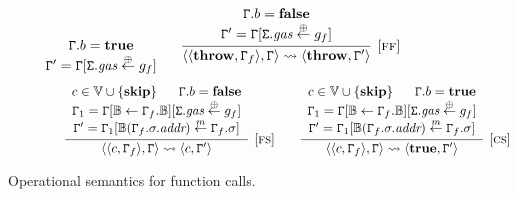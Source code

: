 \begin{figure}[t]
$${
	\begin{array}{c}	
	\cstate.b = \textbf{true}\\
	\cstate' = \cstate[\gstate.\textit{gas} \addg g_f]
	\end{array}
}
~~~~
\infer[{[\rname{ff}]}]{\conf{\conf{\textbf{throw},\cstate_f},\cstate} \leadsto \conf{\textbf{throw},\cstate'}}
{
	\begin{array}{c}	
	\cstate.b = \textbf{false}\\
	\cstate' = \cstate[\gstate.\textit{gas} \addg g_f]
	\end{array}
}
$$
\vspace{-0.5em}
$$
~~~~~~~~~~~~~
\infer[{[\rname{fs}]}]{\conf{\conf{c,\cstate_f},\cstate} \leadsto \conf{c,\cstate'}}
{
	\begin{array}{c}
	c \in \mathbb{V} \cup \{\textbf{skip}\}	~~~~~ \cstate.b = \textbf{false}
	\\
	\cstate_1 = \cstate[\chain \leftarrow \cstate_f.\chain][\gstate.\textit{gas} \addg g_f]
	\\
	\cstate' = \cstate_1[\chain(\cstate_f.\lstate.\textit{addr}) \stackrel{m}{\leftarrow} \cstate_f.\lstate]
	\end{array}
}
~~~~~~
\infer[{[\rname{cs}]}]{\conf{\conf{c,\cstate_f},\cstate} \leadsto \conf{\textbf{true},\cstate'}}
{
	\begin{array}{c}
	c \in \mathbb{V} \cup \{\textbf{skip}\}	~~~~~ \cstate.b = \textbf{true}\\
	\cstate_1 = \cstate[\chain \leftarrow \cstate_f.\chain][\gstate.\textit{gas} \addg g_f]
	\\
	\cstate' = \cstate_1[\chain(\cstate_f.\lstate.\textit{addr}) \stackrel{m}{\leftarrow} \cstate_f.\lstate]
	\end{array}
}
$$
\caption{Operational semantics for function calls.}\label{fig:opfun}
\end{figure}

